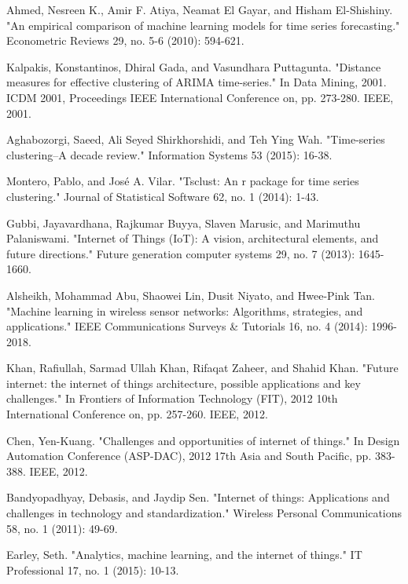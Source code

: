 \begin{thebibliography}{00}
	 Ahmed, Nesreen K., Amir F. Atiya, Neamat El Gayar, and Hisham El-Shishiny. "An empirical comparison of machine learning models for time series forecasting." Econometric Reviews 29, no. 5-6 (2010): 594-621.
	
	 Kalpakis, Konstantinos, Dhiral Gada, and Vasundhara Puttagunta. "Distance measures for effective clustering of ARIMA time-series." In Data Mining, 2001. ICDM 2001, Proceedings IEEE International Conference on, pp. 273-280. IEEE, 2001.
	
	 Aghabozorgi, Saeed, Ali Seyed Shirkhorshidi, and Teh Ying Wah. "Time-series clustering–A decade review." Information Systems 53 (2015): 16-38.
	
	 Montero, Pablo, and José A. Vilar. "Tsclust: An r package for time series clustering." Journal of Statistical Software 62, no. 1 (2014): 1-43.
	
	 Gubbi, Jayavardhana, Rajkumar Buyya, Slaven Marusic, and Marimuthu Palaniswami. "Internet of Things (IoT): A vision, architectural elements, and future directions." Future generation computer systems 29, no. 7 (2013): 1645-1660.
	
	 Alsheikh, Mohammad Abu, Shaowei Lin, Dusit Niyato, and Hwee-Pink Tan. "Machine learning in wireless sensor networks: Algorithms, strategies, and applications." IEEE Communications Surveys \& Tutorials 16, no. 4 (2014): 1996-2018.
	
	 Khan, Rafiullah, Sarmad Ullah Khan, Rifaqat Zaheer, and Shahid Khan. "Future internet: the internet of things architecture, possible applications and key challenges." In Frontiers of Information Technology (FIT), 2012 10th International Conference on, pp. 257-260. IEEE, 2012.
	
	 Chen, Yen-Kuang. "Challenges and opportunities of internet of things." In Design Automation Conference (ASP-DAC), 2012 17th Asia and South Pacific, pp. 383-388. IEEE, 2012.
	
	 Bandyopadhyay, Debasis, and Jaydip Sen. "Internet of things: Applications and challenges in technology and standardization." Wireless Personal Communications 58, no. 1 (2011): 49-69.
	
	 Earley, Seth. "Analytics, machine learning, and the internet of things." IT Professional 17, no. 1 (2015): 10-13.
	

\end{thebibliography}
